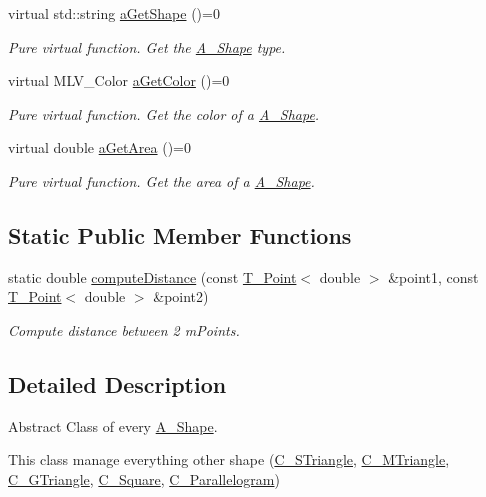 \begin{DoxyCompactItemize}
virtual std\+::string \hyperlink{classA__Shape_a1b202256a4e5dcb0edab4ab93a37122c}{a\+Get\+Shape} ()=0
\begin{DoxyCompactList}\small\item\em Pure virtual function. Get the \hyperlink{classA__Shape}{A\+\_\+\+Shape} type. \end{DoxyCompactList}\item 
virtual M\+L\+V\+\_\+\+Color \hyperlink{classA__Shape_a1e90c8132d33e4ac84d42f72606193b2}{a\+Get\+Color} ()=0
\begin{DoxyCompactList}\small\item\em Pure virtual function. Get the color of a \hyperlink{classA__Shape}{A\+\_\+\+Shape}. \end{DoxyCompactList}\item 
virtual double \hyperlink{classA__Shape_a1b142ee2d873d6c217f65de1632e7b6e}{a\+Get\+Area} ()=0
\begin{DoxyCompactList}\small\item\em Pure virtual function. Get the area of a \hyperlink{classA__Shape}{A\+\_\+\+Shape}. \end{DoxyCompactList}\end{DoxyCompactItemize}
\subsection*{Static Public Member Functions}
\begin{DoxyCompactItemize}
\item 
static double \hyperlink{classA__Shape_a2c663e21cf31002323b83f9f98234d33}{compute\+Distance} (const \hyperlink{classT__Point}{T\+\_\+\+Point}$<$ double $>$ \&point1, const \hyperlink{classT__Point}{T\+\_\+\+Point}$<$ double $>$ \&point2)
\begin{DoxyCompactList}\small\item\em Compute distance between 2 m\+Points. \end{DoxyCompactList}\end{DoxyCompactItemize}


\subsection{Detailed Description}
Abstract Class of every \hyperlink{classA__Shape}{A\+\_\+\+Shape}. 

This class manage everything other shape (\hyperlink{classC__STriangle}{C\+\_\+\+S\+Triangle}, \hyperlink{classC__MTriangle}{C\+\_\+\+M\+Triangle}, \hyperlink{classC__GTriangle}{C\+\_\+\+G\+Triangle}, \hyperlink{classC__Square}{C\+\_\+\+Square}, \hyperlink{classC__Parallelogram}{C\+\_\+\+Parallelogram}) 

